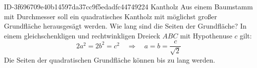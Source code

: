 \begin{exercise}
      {ID-3f696709e40b14597da37cc9f5edadfc44749224}
      {Kantholz}
  \ifproblem\problem
    Aus einem Baumstamm mit  Durchmesser soll ein quadratisches Kantholz
    mit möglichst großer Grundfläche herausgesägt werden. Wie lang sind die
    Seiten der Grundfläche?
  \fi
  \ifoutline\outline
    In einem gleichschenkligen und rechtwinkligen Dreieck $ABC$ mit
    Hypothenuse $c$ gilt:
    \begin{equation*}
      2a^2=2b^2=c^2
      \quad\Rightarrow\quad
      a=b=\frac{c}{\sqrt{2}}
    \end{equation*}
  \fi
  \ifoutcome\outcome
    Die Seiten der quadratischen Grundfläche können bis zu
     lang werden.
  \fi
\end{exercise}
